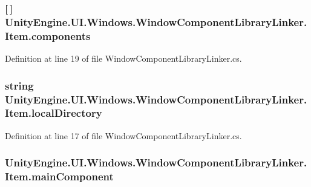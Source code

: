 \subsubsection[{components}]{ \mbox{[}$\,$\mbox{]} Unity\+Engine.\+U\+I.\+Windows.\+Window\+Component\+Library\+Linker.\+Item.\+components}\label{class_unity_engine_1_1_u_i_1_1_windows_1_1_window_component_library_linker_1_1_item_a4eccd950c48f86dcac9172ab1ae957fd}


Definition at line 19 of file Window\+Component\+Library\+Linker.\+cs.

\hypertarget{class_unity_engine_1_1_u_i_1_1_windows_1_1_window_component_library_linker_1_1_item_aa449dab386eb65f5b773cdf5a574b49b}{}
\subsubsection[{local\+Directory}]{\setlength{\rightskip}{0pt plus 5cm}string Unity\+Engine.\+U\+I.\+Windows.\+Window\+Component\+Library\+Linker.\+Item.\+local\+Directory}\label{class_unity_engine_1_1_u_i_1_1_windows_1_1_window_component_library_linker_1_1_item_aa449dab386eb65f5b773cdf5a574b49b}


Definition at line 17 of file Window\+Component\+Library\+Linker.\+cs.

\hypertarget{class_unity_engine_1_1_u_i_1_1_windows_1_1_window_component_library_linker_1_1_item_a62308bb1a421bb883491e309fa0d9164}{}
\subsubsection[{main\+Component}]{ Unity\+Engine.\+U\+I.\+Windows.\+Window\+Component\+Library\+Linker.\+Item.\+main\+Component}\label{class_unity_engine_1_1_u_i_1_1_windows_1_1_window_component_library_linker_1_1_item_a62308bb1a421bb883491e309fa0d9164}



